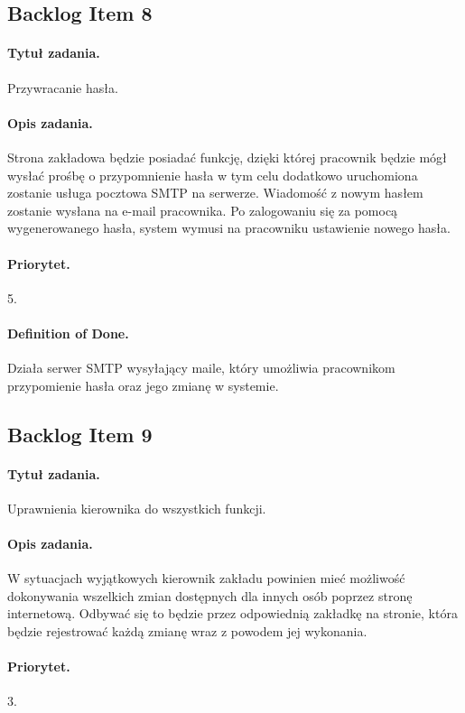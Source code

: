 \documentclass[a4paper]{article}
\begin{document}
\subsection{Backlog Item 8}
\paragraph{Tytuł zadania.} Przywracanie hasła.
\paragraph{Opis zadania.} Strona zakładowa będzie posiadać funkcję, dzięki której pracownik będzie mógł wysłać prośbę o przypomnienie hasła w tym celu dodatkowo uruchomiona zostanie usługa pocztowa SMTP na serwerze. Wiadomość z nowym hasłem zostanie wysłana na e-mail pracownika. Po zalogowaniu się za pomocą wygenerowanego hasła, system wymusi na pracowniku ustawienie nowego hasła.
\paragraph{Priorytet.} 5.
\paragraph{Definition of Done.} Działa serwer SMTP wysyłający maile, który umożliwia pracownikom przypomienie hasła oraz jego zmianę w systemie.

\subsection{Backlog Item 9}
\paragraph{Tytuł zadania.} Uprawnienia kierownika do wszystkich funkcji.
\paragraph{Opis zadania.} W sytuacjach wyjątkowych kierownik zakładu powinien mieć możliwość dokonywania wszelkich zmian dostępnych dla innych osób poprzez stronę internetową. Odbywać się to będzie przez odpowiednią zakładkę na stronie, która będzie rejestrować każdą zmianę wraz z powodem jej wykonania.
\paragraph{Priorytet.} 3.
\end{document}
